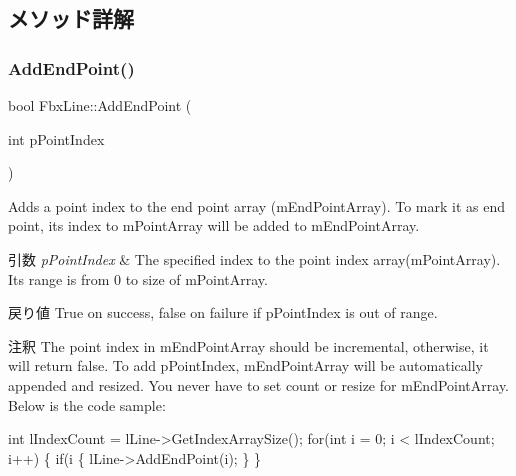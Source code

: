 \subsection{メソッド詳解}
\mbox{\label{class_fbx_line_ad648323a73b0b4f1bf9cfae2fdb65e23}} 
\subsubsection{\texorpdfstring{Add\+End\+Point()}{AddEndPoint()}}
{\footnotesize\ttfamily bool Fbx\+Line\+::\+Add\+End\+Point (\begin{DoxyParamCaption}\item[{int}]{p\+Point\+Index }\end{DoxyParamCaption})}

Adds a point index to the end point array (m\+End\+Point\+Array). To mark it as end point, its index to m\+Point\+Array will be added to m\+End\+Point\+Array. 
\begin{DoxyParams}{引数}
{\em p\+Point\+Index} & The specified index to the point index array(m\+Point\+Array). Its range is from 0 to size of m\+Point\+Array. \\
\hline
\end{DoxyParams}
\begin{DoxyReturn}{戻り値}
True on success, false on failure if p\+Point\+Index is out of range. 
\end{DoxyReturn}
\begin{DoxyRemark}{注釈}
The point index in m\+End\+Point\+Array should be incremental, otherwise, it will return false. To add p\+Point\+Index, m\+End\+Point\+Array will be automatically appended and resized. You never have to set count or resize for m\+End\+Point\+Array. Below is the code sample\+: 
\begin{DoxyCode}
\textcolor{keywordtype}{int} lIndexCount = lLine->GetIndexArraySize();
\textcolor{keywordflow}{for}(\textcolor{keywordtype}{int} i = 0; i < lIndexCount; i++)
\{
    \textcolor{keywordflow}{if}(i%
    \{
        lLine->AddEndPoint(i);
    \}
\}
\end{DoxyCode}
 
\end{DoxyRemark}
\mbox{\label{class_fbx_line_a0829ee40fdecef0b749c3b026744c31a}} 
